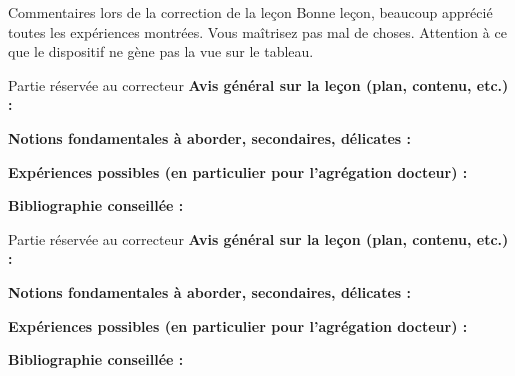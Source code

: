 \begin{reportBlock}{Commentaires lors de la correction de la leçon}
Bonne leçon, beaucoup apprécié toutes les expériences montrées. Vous maîtrisez pas mal de choses. Attention à ce que le dispositif ne gène pas la vue sur le tableau.\\


\end{reportBlock}



\begin{reportBlock}{Partie réservée au correcteur}
  \textbf{Avis général sur la leçon (plan, contenu, etc.) :}
  
  
  \textbf{Notions fondamentales à aborder, secondaires, délicates :}
  
  
  \textbf{Expériences possibles (en particulier pour l'agrégation docteur) :}
  
  
  \textbf{Bibliographie conseillée :}
\end{reportBlock}


\begin{reportBlock}{Partie réservée au correcteur}
  \textbf{Avis général sur la leçon (plan, contenu, etc.) :}
  
  
  \textbf{Notions fondamentales à aborder, secondaires, délicates :}
  
  
  \textbf{Expériences possibles (en particulier pour l'agrégation docteur) :}
  
  
  \textbf{Bibliographie conseillée :}
\end{reportBlock}